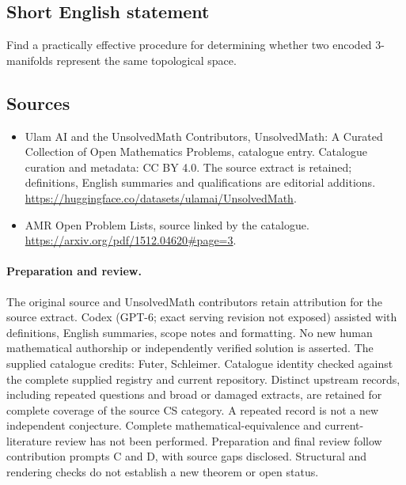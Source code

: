 \documentclass[11pt]{article}
\begin{document}
\subsection{Short English statement}
Find a practically effective procedure for determining whether two encoded 3-manifolds represent the same topological space.
\subsection{Sources}
\begin{itemize}
\item[\hypertarget{source:statement:1}{S1}] Ulam AI and the UnsolvedMath Contributors, UnsolvedMath: A Curated Collection of Open Mathematics Problems, catalogue entry. Catalogue curation and metadata: CC BY 4.0. The source extract is retained; definitions, English summaries and qualifications are editorial additions.
\url{https://huggingface.co/datasets/ulamai/UnsolvedMath}.
\item[\hypertarget{source:statement:2}{S2}] AMR Open Problem Lists, source linked by the catalogue.
\url{https://arxiv.org/pdf/1512.04620#page=3}.
\end{itemize}
\paragraph{Preparation and review.}
The original source and UnsolvedMath contributors retain attribution for the source extract. Codex (GPT-6; exact serving revision not exposed) assisted with definitions, English summaries, scope notes and formatting. No new human mathematical authorship or independently verified solution is asserted. The supplied catalogue credits: Futer, Schleimer. Catalogue identity checked against the complete supplied registry and current repository. Distinct upstream records, including repeated questions and broad or damaged extracts, are retained for complete coverage of the source CS category. A repeated record is not a new independent conjecture. Complete mathematical-equivalence and current-literature review has not been performed. Preparation and final review follow contribution prompts C and D, with source gaps disclosed. Structural and rendering checks do not establish a new theorem or open status.
\label{end:statement}
\end{document}

